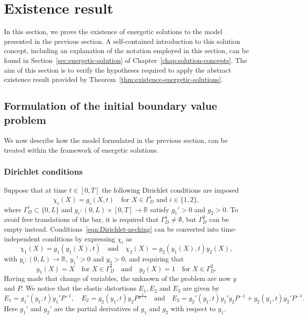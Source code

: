 \documentclass[a4paper,10pt,oneside]{amsbook}
\numberwithin{section}{chapter}
\numberwithin{equation}{chapter}
\theoremstyle{definition}
\begin{document}
\section{Existence result}
\label{sec:existence-necking}

In this section, we prove the existence of energetic solutions to the model presented in the previous section. A self-contained introduction to this solution concept, including an explanation of the notation employed in this section, can be found in Section~\ref{sec:energetic-solution} of Chapter~\ref{chap:solution-concepts}. The aim of this section is to verify the hypotheses required to apply the abstract existence result provided by Theorem~\ref{thm:existence-energetic-solutions}.

\subsection{Formulation of the initial boundary value problem}
\label{subsec:formulation-bvp-neck}

We now describe how the model formulated in the previous section, can be treated within the framework of energetic solutions.

\subsubsection*{Dirichlet conditions}

Suppose that at time $t\in[0,T]$ the following Dirichlet conditions are imposed
\begin{equation}
\label{eqn:Dirichlet-necking}
\chi_i(X)=g_i(X,t)\quad\text{for $X\in\Gamma_D^i$ and $i\in\{1,2\}$},
\end{equation}
where $\Gamma_D^i\subset\{0,L\}$ and $g_i\colon(0,L)\times[0,T]\to\mathbb{R}$ satisfy $g_1'>0$ and $g_2>0$. To avoid free translations of the bar, it is required that $\Gamma_D^1\neq\emptyset$, but $\Gamma_D^2$ can be empty instead. Conditions~\eqref{eqn:Dirichlet-necking} can be converted into time-independent conditions by expressing $\chi_i$ as
\[
\chi_1(X)=g_1(y_1(X),t)\quad\text{and}\quad\chi_2(X)=g_2(y_1(X),t)y_2(X),
\]
with $y_i\colon(0,L)\to\mathbb{R}$, $y_1'>0$ and $y_2>0$, and requiring that
\[
y_1(X)=X\quad\text{for $X\in\Gamma_D^1$}\quad\text{and}\quad y_2(X)=1\quad\text{for $X\in\Gamma_D^2$}.
\]
Having made that change of variables, the unknown of the problem are now $y$ and $P$. We notice that the elastic distortions $E_1,E_2$ and $E_3$ are given by
\[
E_1=g_1'(y_1,t)y_1'P^{-1},\quad E_2=g_2(y_1,t)y_2P^{\frac{1}{d-1}}\quad\text{and}\quad E_3=g_2'(y_1,t)y_1'y_2P^{-1}+g_2(y_1,t)y_2'P^{-1}.
\]
Here $g_1'$ and $g_2'$ are the partial derivatives of $g_1$ and $g_2$ with respect to $y_1$.
\end{document}
